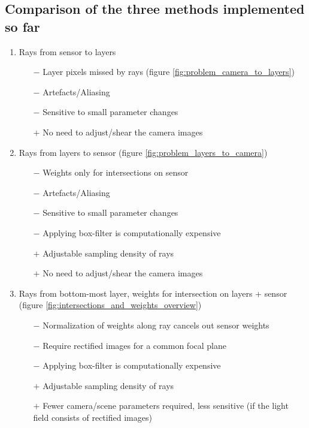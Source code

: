 \documentclass[11pt,a4paper,titlepage]{article}
\begin{document}
\subsection{Comparison of the three methods implemented so far}

\begin{enumerate}
	\item	Rays from sensor to layers
		\begin{itemize}
			\item[$-$]	Layer pixels missed by rays	(figure \ref{fig:problem_camera_to_layers})
			\item[$-$]	Artefacts/Aliasing
			\item[$-$]	Sensitive to small parameter changes
			\item[$+$]	No need to adjust/shear the camera images
		\end{itemize}
	\item	Rays from layers to sensor (figure \ref{fig:problem_layers_to_camera})
		\begin{itemize}
			\item[$-$]	Weights only for intersections on sensor 
			\item[$-$]	Artefacts/Aliasing
			\item[$-$]	Sensitive to small parameter changes
			\item[$-$]	Applying box-filter is computationally expensive
			\item[$+$]	Adjustable sampling density of rays
			\item[$+$]	No need to adjust/shear the camera images
		\end{itemize}
	\item	Rays from bottom-most layer, weights for intersection on layers + sensor (figure \ref{fig:intersections_and_weights_overview})
		\begin{itemize}
			\item[$-$]	Normalization of weights along ray cancels out sensor weights
			\item[$-$]	Require rectified images for a common focal plane
			\item[$-$]	Applying box-filter is computationally expensive
			\item[$+$]	Adjustable sampling density of rays
			\item[$+$]	Fewer camera/scene parameters required, less sensitive (if the light field consists of rectified images)
		\end{itemize}
\end{enumerate}
\end{document}
